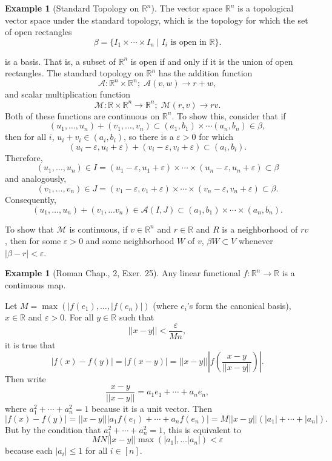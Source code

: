 \documentclass{article}
\theoremstyle{definition}
\newtheorem{exmp}[thm]{Example}
\theoremstyle{remark}
\numberwithin{equation}{section}
\begin{document}
\begin{exmp}[Standard Topology on $\mathbb{R}^n$]
The vector space $\mathbb{R}^n$ is a topological vector space under the standard topology, which is the topology for which the set of open rectangles 
$$\beta = \{ I_1 \times \cdots \times I_n \; | \; I_i \text{ is open in } \mathbb{R} \} . $$
\end{exmp}
is a basis. That is, a subset of $\mathbb{R}^n$ is open if and only if it is the union of open rectangles. The standard topology on $\mathbb{R}^n$ has the addition function 
$$\mathcal{A} : \mathbb{R}^ n \times \mathbb{R}^n ; \; \mathcal{A} (v, w) \rightarrow r + w, $$
and scalar multiplication function 
$$\mathcal{M} : \mathbb{R} \times \mathbb{R} ^n \rightarrow \mathbb{R}^n ; \; \mathcal{M} (r, v) \rightarrow rv.  $$
Both of these functions are continuous on $\mathbb{R}^n.$ To show this, consider
that if 
$$(u_1, \dots, u_n) + (v_1, \dots , v_n) \subset (a_1, b_1) \times \cdots (a_n , b_n) \in \beta, $$
then for all $i$, $u_i + v_i \in (a_i , b_i) $, so there is a $\varepsilon > 0 $ for which 
$$(u_i - \varepsilon , u_i + \varepsilon ) + (v_i - \varepsilon, v_i + \varepsilon) \subset (a_i, b_i). $$
Therefore,  
$$(u_1, \dots , u_n ) \in I = (u_1 - \varepsilon , u_1 + \varepsilon ) \times \cdots \times (u_n - \varepsilon , u_n + \varepsilon ) \subset \beta$$
and analogously, 
$$(v_1, \dots , v_n ) \in J = (v_1 - \varepsilon , v_1 + \varepsilon ) \times \cdots \times (v_n - \varepsilon , v_n + \varepsilon ) \subset \beta.$$
Consequently, 
$$ (u_1, \dots, u_n) + (v_1, \dots v_n ) \in \mathcal{A} (I, J) \subset (a_1, b_1) \times \cdots \times (a_n, b_n).$$

To show that $\mathcal{M}$ is continuous, if $v \in \mathbb{R}^n$ and $r \in \mathbb{R}$ and $R$ is a neighborhood of $rv$, then for some $\varepsilon > 0$ and some neighborhood $W$ of $v$, $\beta W \subset V$ whenever $|\beta - r| < \varepsilon$. 

\begin{exmp}[Roman Chap., 2, Exer. 25]
Any linear functional $f : \mathbb{R}^n \rightarrow \mathbb{R}$ is a continuous map. 

Let $M = \max (|f(e_1), \dots , |f(e_n)| )$ (where $e_i$'s form the canonical basis), $x \in \mathbb{R}$ and $\varepsilon > 0$. For all $y \in \mathbb{R}$ such that 
$$|| x- y|| < \frac{\varepsilon}{Mn}, $$
it is true that 
$$|f(x) - f(y)| = |f(x-y)| = ||x-y|| \left| f\left( \frac{x-y}{||x-y||}\right) \right|.$$
Then write 
$$\frac{x-y}{||x-y||} = a_1 e_1 + \cdots + a_n e_n, $$
where $a_1^2 + \cdots + a_n ^2 =1 $ because it is a unit vector. Then 
$$|f(x) - f(y)| = ||x-y|||a_1f(e_1) + \cdots + a_n f(e_n)| = M||x-y||(|a_1| + \cdots + |a_n|). $$
But by the condition that $a_1 ^ 2+ \cdots + a_n ^2 = 1$, this is equivalent to 
$$MN ||x-y|| \max(|a_1| , \dots |a_n|) < \varepsilon $$
because each $|a_i| \leq 1$ for all $i \in [ n].$ 
\end{exmp}
\end{document}
